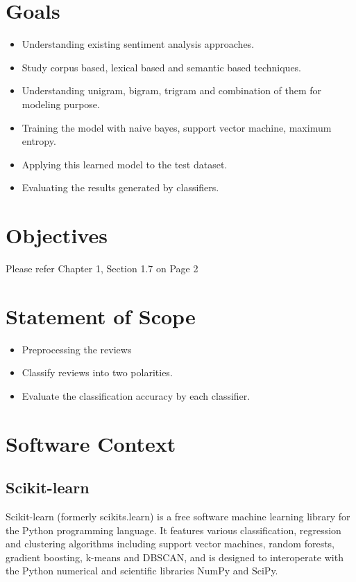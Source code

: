 \documentclass[oneside,a4paper,12pt]{pictreport}
\begin{document}
\section{Goals}
\begin{itemize}
\item Understanding existing sentiment analysis approaches.
\item Study corpus based, lexical based and semantic based techniques.
\item Understanding unigram, bigram, trigram and combination of them for modeling purpose.
\item Training the model with naive bayes, support vector machine, maximum entropy.
\item Applying this learned model to the test dataset.
\item Evaluating the results generated by classifiers.
\end{itemize}

\section{Objectives}

Please refer Chapter 1, Section 1.7 on Page 2

\section{Statement of Scope}
\begin{itemize}
\item Preprocessing the reviews
\item Classify reviews into two polarities.
\item Evaluate the classification accuracy by each classifier.
\end{itemize}

\section{Software Context}
\subsection{Scikit-learn} 
Scikit-learn (formerly scikits.learn) is a free software machine learning library for the 
Python programming language. It features various classification, regression and clustering
algorithms including support vector machines, random forests, gradient boosting, k-means and DBSCAN, and is designed to interoperate with the Python numerical and scientific libraries NumPy and SciPy.
\end{document}
